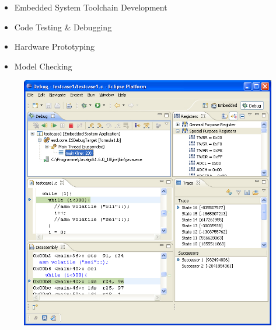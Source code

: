 \begin{block}{\large {}\vphantom{Future}}
\begin{itemize}
    \item Embedded System Toolchain Development
    \item Code Testing \& Debugging
    \item Hardware Prototyping
    \item Model Checking
\end{itemize}
    \begin{figure}[!htb]
        \vspace{-100pt}
        \hspace{350pt}
        \includegraphics{figures/overview.jpg}
    \end{figure}
\end{block}
